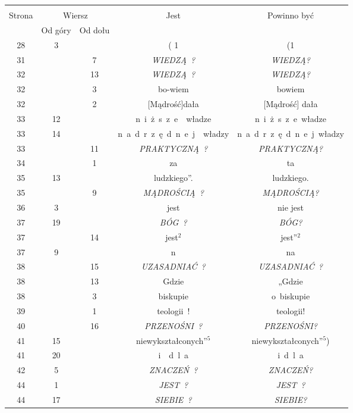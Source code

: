 \documentclass[a4paper,11pt]{article}
\begin{document}
\begin{center}
  \begin{tabular}{|c|c|c|c|c|}
    \hline
    & \multicolumn{2}{c|}{} & & \\
    Strona & \multicolumn{2}{c|}{Wiersz} & Jest
                              & Powinno być \\ \cline{2-3}
    & Od góry & Od dołu & & \\
    \hline
    28  &  3 & & ( 1 & (1 \\
    31  & &  7 & \textit{WIEDZĄ~?} & \textit{WIEDZĄ?} \\
    32  & & 13 & \textit{WIEDZĄ~?} & \textit{WIEDZĄ?} \\
    32  & &  3 & bo-wiem & bowiem \\
    32  & &  2 & [Mądrość]dała & [Mądrość] dała \\
    33  & 12 & & n~i~ż~s~z~e~~władze & n~i~ż~s~z~e\, władze \\
    33  & 14 & & n~a~d~r~z~ę~d~n~e~j~~władzy
           & n~a~d~r~z~ę~d~n~e~j\, władzy \\
    33  & & 11 & \textit{PRAKTYCZNĄ~?} & \textit{PRAKTYCZNĄ?} \\
    34  & &  1 & za & ta \\
    35  & 13 & & ludzkiego”. & ludzkiego. \\
    35  & &  9 & \textit{MĄDROŚCIĄ~?} & \textit{MĄDROŚCIĄ?} \\
    36  &  3 & & jest & nie jest \\
    37  & 19 & & \textit{BÓG~?} & \textit{BÓG?} \\
    37  & & 14 & jest$^{ 2 }$ & jest''$^{ 2 }$ \\
    37  &  9 & & n & na \\
    38  & & 15 & \textit{UZASADNIAĆ~?} & \textit{UZASADNIAĆ~?} \\
    38  & & 13 & Gdzie & „Gdzie \\
    38  & &  3 & biskupie & o~biskupie \\
    39  & &  1 & teologii~! & teologii! \\
    40  & & 16 & \textit{PRZENOŚNI~?} & \textit{PRZENOŚNI?} \\
    41  & 15 & & niewykształconych”$^{ 5 }$
           & niewykształconych”$^{ 5 }$) \\
    41  & 20 & & i~~d~l~a & i{}\, d~l~a \\
    42  &  5 & & \textit{ZNACZEŃ~?} & \textit{ZNACZEŃ?} \\
    44  &  1 & & \textit{JEST~?} & \textit{JEST~?} \\
    44  & 17 & & \textit{SIEBIE~?} & \textit{SIEBIE?} \\

\end{tabular}
\end{center}
\end{document}
